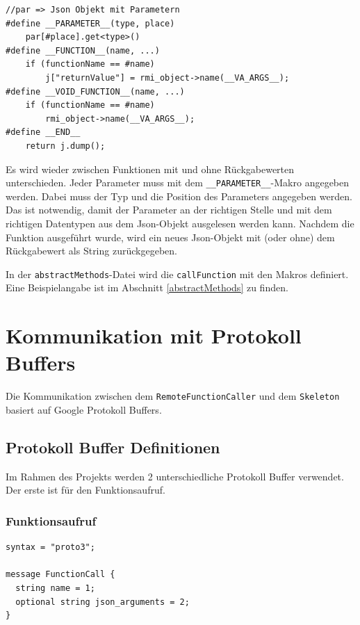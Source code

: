 \documentclass[a4paper,oneside,10pt]{report}
\begin{document}
\begin{lstlisting}
//par => Json Objekt mit Parametern
#define __PARAMETER__(type, place) 
	par[#place].get<type>()
#define __FUNCTION__(name, ...)  
	if (functionName == #name)
		j["returnValue"] = rmi_object->name(__VA_ARGS__);
#define __VOID_FUNCTION__(name, ...) 
	if (functionName == #name)
		rmi_object->name(__VA_ARGS__);
#define __END__ 
	return j.dump();
\end{lstlisting}

Es wird wieder zwischen Funktionen mit und ohne Rückgabewerten unterschieden. Jeder Parameter muss mit dem \texttt{\_\_PARAMETER\_\_}-Makro angegeben werden. Dabei muss der Typ und die Position des Parameters angegeben werden. Das ist notwendig, damit der Parameter an der richtigen Stelle und mit dem richtigen Datentypen aus dem Json-Objekt ausgelesen werden kann. Nachdem die Funktion ausgeführt wurde, wird ein neues Json-Objekt mit (oder ohne) dem Rückgabewert als String zurückgegeben. 

In der \texttt{abstractMethods}-Datei wird die \texttt{callFunction} mit den Makros definiert. Eine Beispielangabe ist im Abschnitt \ref{abstractMethods} zu finden. 

\section{Kommunikation mit Protokoll Buffers} \label{kommunikation}

Die Kommunikation zwischen dem \texttt{RemoteFunctionCaller} und dem \texttt{Skeleton} basiert auf Google Protokoll Buffers.  

\subsection{Protokoll Buffer Definitionen}

Im Rahmen des Projekts werden 2 unterschiedliche Protokoll Buffer verwendet. Der erste ist für den Funktionsaufruf. 

\subsubsection{Funktionsaufruf}

\begin{lstlisting}
syntax = "proto3";

message FunctionCall {
  string name = 1;
  optional string json_arguments = 2;
}
\end{lstlisting}
\end{document}
